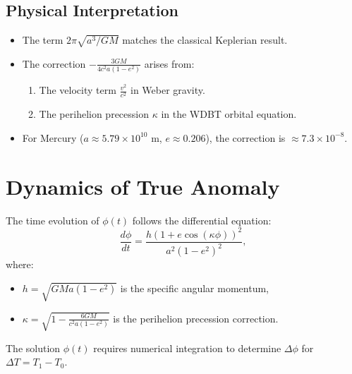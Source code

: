 \subsection*{Physical Interpretation}
\begin{itemize}
\item The term \( 2\pi \sqrt{a^3/GM} \) matches the classical Keplerian result.
\item The correction \( -\frac{3GM}{4c^2 a(1-e^2)} \) arises from:
  \begin{enumerate}
  \item The velocity term \( \frac{v^2}{c^2} \) in Weber gravity.
  \item The perihelion precession \( \kappa \) in the WDBT orbital equation.
  \end{enumerate}
\item For Mercury (\( a \approx 5.79 \times 10^{10} \) m, \( e \approx 0.206 \)), the correction is \( \approx 7.3 \times 10^{-8} \).
\end{itemize}

\section{Dynamics of True Anomaly}
The time evolution of \(\phi(t)\) follows the differential equation:
\[
\frac{d\phi}{dt} = \frac{h (1 + e \cos(\kappa \phi))^2}{a^2 (1-e^2)^2},
\]
where:
\begin{itemize}
\item \(h = \sqrt{GMa(1-e^2)}\) is the specific angular momentum,
\item \(\kappa = \sqrt{1 - \frac{6GM}{c^2 a(1-e^2)}}\) is the perihelion precession correction.
\end{itemize}
The solution \(\phi(t)\) requires numerical integration to determine \(\Delta \phi\) for \(\Delta T = T_1 - T_0\).
